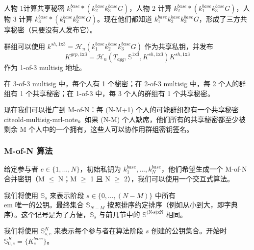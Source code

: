 人物 1计算共享秘密 $k^{base}_1*(k^{base}_2 k^{base}_3 G)$，人物 2 计算 $k^{base}_2*(k^{base}_1 k^{base}_3 G)$，人物 3 计算 $k^{base}_3*(k^{base}_1 k^{base}_2 G)$。现在他们都知道 $k^{base}_1 k^{base}_2 k^{base}_3 G$，形成了三方共享秘密（只要没有人发布它）。

群组可以使用 $k^{sh,\textrm{1x3}} = \mathcal{H}_n(k^{base}_1 k^{base}_2 k^{base}_3 G)$ 作为共享私钥，并发布\vspace{.155cm} \[K^{grp,\textrm{1x3}} = \mathcal{H}_n(T_{agg},\mathbb{S}^{\textrm{1x3}},K^{sh,\textrm{1x3}}) K^{sh,\textrm{1x3}}\] 作为 1-of-3 multisig 地址。

在 3-of-3 multisig 中，每个人有 1 个秘密；在 2-of-3 multisig 中，每 2 个人的群组有 1 个共享秘密；在 1-of-3 中，每 3 个人的群组有 1 个共享秘密。

现在我们可以推广到 M-of-N：每 (N-M+1) 个人的可能群组都有一个共享秘密 \\cite{old-multisig-mrl-note}。如果 (N-M) 个人缺席，他们所有的共享秘密都至少被剩余 M 个人中的一个拥有，这些人可以协作用群组密钥签名。

\subsubsection*{M-of-N 算法}

给定参与者 $e \in \{1,...,N\}$，初始私钥为 $k^{base}_1,...,k^{base}_N$，他们希望生成一个 M-of-N 合并密钥（M $\leq$ N；M $\geq$ 1 且 N $\geq$ 2），我们可以使用一个交互式算法。

我们将使用 $\mathbb{S}_s$ 来表示阶段 $s \in \{0,...,(N-M)\}$ 中所有{\\em 唯一}的公钥。最终集合 $\mathbb{S}_{N-M}$ 按照排序约定排序（例如从小到大，即字典序）。这个记号是为了方便，$\mathbb{S}_s$ 与前几节中的 $\mathbb{S}^{\textrm{(N-s)xN}}$ 相同。

我们将使用 $\mathbb{S}^K_{s,e}$ 来表示每个参与者在算法阶段 $s$ 创建的公钥集合。开始时 $\mathbb{S}^K_{0,e} = \{K^{base}_e\}$。

